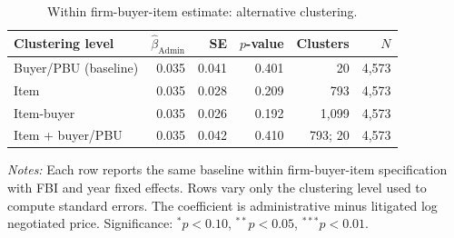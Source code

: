 \begin{table}[ht]
\centering
\caption{Within firm-buyer-item estimate: alternative clustering.}
\label{tab:within_firm_alt_cluster}
\begin{threeparttable}
\begin{tabular}{lrrrrr}
\toprule
Clustering level & $\hat\beta_{\text{Admin}}$ & SE & $p$-value & Clusters & $N$ \\
\midrule
Buyer/PBU (baseline) & 0.035 & 0.041 & 0.401 & 20 & 4,573 \\
Item & 0.035 & 0.028 & 0.209 & 793 & 4,573 \\
Item-buyer & 0.035 & 0.026 & 0.192 & 1,099 & 4,573 \\
Item + buyer/PBU & 0.035 & 0.042 & 0.410 & 793; 20 & 4,573 \\
\bottomrule
\end{tabular}
\begin{tablenotes}[flushleft]\footnotesize
\item \textit{Notes:} Each row reports the same baseline within firm-buyer-item specification with FBI and year fixed effects. Rows vary only the clustering level used to compute standard errors. The coefficient is administrative minus litigated log negotiated price. Significance: $^{*}p<0.10$, $^{**}p<0.05$, $^{***}p<0.01$.
\end{tablenotes}
\end{threeparttable}
\end{table}
